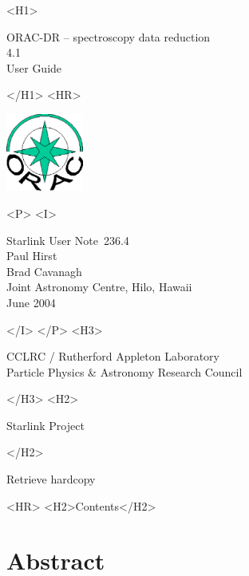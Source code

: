 \documentclass[twoside,11pt]{article}
\newcommand{\stardoccategory}  {Starlink User Note}
\newcommand{\stardocsource}    {sun\stardocnumber}
\newcommand{\stardocnumber}    {236.4}
\newcommand{\stardocauthors}   {Paul Hirst \\ Brad Cavanagh \\
                                Joint Astronomy Centre, Hilo, Hawaii}
\newcommand{\stardocdate}      {June 2004}
\newcommand{\stardoctitle}     {ORAC-DR -- spectroscopy data reduction}
\newcommand{\stardocversion}   {4.1}
\newcommand{\stardocmanual}    {User Guide}
\newcommand{\htmladdnormallink}[2]{#1}
\newcommand{\htmladdimg}[1]{}
\newcommand{\htmlref}[2]{#1}
\newcommand{\htmladdtonavigation}[1]{}
\newcommand{\xlabel}[1]{}
\renewcommand{\_}{\texttt{\symbol{95}}}
\begin{document}
\begin{htmlonly}
   \xlabel{}
   \begin{rawhtml} <H1> \end{rawhtml}
      \stardoctitle\\
      \stardocversion\\
      \stardocmanual
   \begin{rawhtml} </H1> <HR> \end{rawhtml}

\includegraphics[width=1.0in]{sun236_logo.eps}

   \begin{rawhtml} <P> <I> \end{rawhtml}
   \stardoccategory\ \stardocnumber \\
   \stardocauthors \\
   \stardocdate
   \begin{rawhtml} </I> </P> <H3> \end{rawhtml}
      \htmladdnormallink{CCLRC / Rutherford Appleton Laboratory}
                        {http://www.cclrc.ac.uk} \\
      \htmladdnormallink{Particle Physics \& Astronomy Research Council}
                        {http://www.pparc.ac.uk} \\
   \begin{rawhtml} </H3> <H2> \end{rawhtml}
      \htmladdnormallink{Starlink Project}{http://www.starlink.rl.ac.uk/}
   \begin{rawhtml} </H2> \end{rawhtml}
   \htmladdnormallink{\htmladdimg{source.gif} Retrieve hardcopy}
      {http://www.starlink.rl.ac.uk/cgi-bin/hcserver?\stardocsource}\\

  \label{stardoccontents}
  \begin{rawhtml} 
    <HR>
    <H2>Contents</H2>
  \end{rawhtml}
  \htmladdtonavigation{\htmlref{\htmladdimg{contents_motif.gif}}
        {stardoccontents}}

  \section{\xlabel{abstract}Abstract}
\end{htmlonly}
\end{document}
